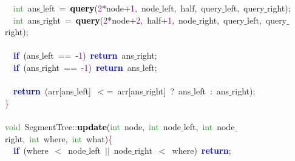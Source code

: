 \mbox{}\ \ \textcolor{ForestGreen}{int}\ ans$\_$left\ \textcolor{BrickRed}{=}\ \textbf{\textcolor{Black}{query}}\textcolor{BrickRed}{(}\textcolor{Purple}{2}\textcolor{BrickRed}{*}node\textcolor{BrickRed}{+}\textcolor{Purple}{1}\textcolor{BrickRed}{,}\ node$\_$left\textcolor{BrickRed}{,}\ half\textcolor{BrickRed}{,}\ query$\_$left\textcolor{BrickRed}{,}\ query$\_$right\textcolor{BrickRed}{);} \\
\mbox{}\ \ \textcolor{ForestGreen}{int}\ ans$\_$right\ \textcolor{BrickRed}{=}\ \textbf{\textcolor{Black}{query}}\textcolor{BrickRed}{(}\textcolor{Purple}{2}\textcolor{BrickRed}{*}node\textcolor{BrickRed}{+}\textcolor{Purple}{2}\textcolor{BrickRed}{,}\ half\textcolor{BrickRed}{+}\textcolor{Purple}{1}\textcolor{BrickRed}{,}\ node$\_$right\textcolor{BrickRed}{,}\ query$\_$left\textcolor{BrickRed}{,}\ query$\_$right\textcolor{BrickRed}{);} \\
\mbox{} \\
\mbox{}\ \ \textbf{\textcolor{Blue}{if}}\ \textcolor{BrickRed}{(}ans$\_$left\ \textcolor{BrickRed}{==}\ \textcolor{BrickRed}{-}\textcolor{Purple}{1}\textcolor{BrickRed}{)}\ \textbf{\textcolor{Blue}{return}}\ ans$\_$right\textcolor{BrickRed}{;} \\
\mbox{}\ \ \textbf{\textcolor{Blue}{if}}\ \textcolor{BrickRed}{(}ans$\_$right\ \textcolor{BrickRed}{==}\ \textcolor{BrickRed}{-}\textcolor{Purple}{1}\textcolor{BrickRed}{)}\ \textbf{\textcolor{Blue}{return}}\ ans$\_$left\textcolor{BrickRed}{;} \\
\mbox{} \\
\mbox{}\ \ \textbf{\textcolor{Blue}{return}}\ \textcolor{BrickRed}{(}arr\textcolor{BrickRed}{[}ans$\_$left\textcolor{BrickRed}{]}\ \textcolor{BrickRed}{$<$=}\ arr\textcolor{BrickRed}{[}ans$\_$right\textcolor{BrickRed}{]}\ \textcolor{BrickRed}{?}\ ans$\_$left\ \textcolor{BrickRed}{:}\ ans$\_$right\textcolor{BrickRed}{);} \\
\mbox{}\textcolor{Red}{\}} \\
\mbox{} \\
\mbox{}\textcolor{ForestGreen}{void}\ SegmentTree\textcolor{BrickRed}{::}\textbf{\textcolor{Black}{update}}\textcolor{BrickRed}{(}\textcolor{ForestGreen}{int}\ node\textcolor{BrickRed}{,}\ \textcolor{ForestGreen}{int}\ node$\_$left\textcolor{BrickRed}{,}\ \textcolor{ForestGreen}{int}\ node$\_$right\textcolor{BrickRed}{,}\ \textcolor{ForestGreen}{int}\ where\textcolor{BrickRed}{,}\ \textcolor{ForestGreen}{int}\ what\textcolor{BrickRed}{)}\textcolor{Red}{\{} \\
\mbox{}\ \ \textbf{\textcolor{Blue}{if}}\ \textcolor{BrickRed}{(}where\ \textcolor{BrickRed}{$<$}\ node$\_$left\ \textcolor{BrickRed}{$|$$|$}\ node$\_$right\ \textcolor{BrickRed}{$<$}\ where\textcolor{BrickRed}{)}\ \textbf{\textcolor{Blue}{return}}\textcolor{BrickRed}{;} \\
